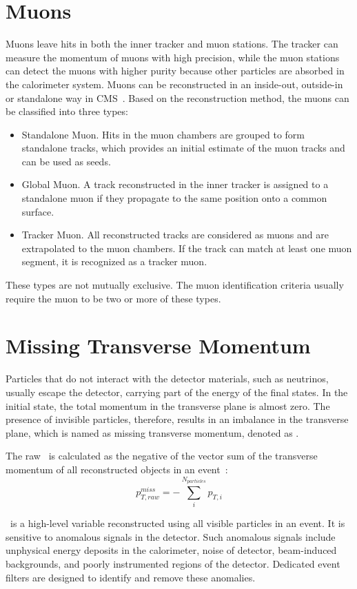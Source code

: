 \documentclass[thesis.tex]{subfiles}
\begin{document}
\section{Muons}
Muons leave hits in both the inner tracker and muon stations.
The tracker can measure the momentum of muons with high precision, while the muon stations can detect the muons with higher purity because other particles are absorbed in the calorimeter system. 
Muons can be reconstructed in an inside-out, outside-in or standalone way in CMS~\cite{MuonPF}.
Based on the reconstruction method, the muons can be classified into three types: 
\begin{itemize}
	\item Standalone Muon. Hits in the muon chambers are grouped to form standalone tracks, which provides an initial estimate of the muon tracks and can be used as seeds.
	\item Global Muon. A track reconstructed in the inner tracker is assigned to a standalone muon if they propagate to the same position onto a common surface. 
	\item Tracker Muon. All reconstructed tracks are considered as muons and are extrapolated to the muon chambers. If the track can match at least one muon segment, it is recognized as a tracker muon. 
\end{itemize}
These types are not mutually exclusive.
The muon identification criteria usually require the muon to be two or more of these types. 

\section{Missing Transverse Momentum}
Particles that do not interact with the detector materials, such as neutrinos, usually escape the detector, carrying part of the energy of the final states.
In the initial state, the total momentum in the transverse plane is almost zero. 
The presence of invisible particles, therefore, results in an imbalance in the transverse plane, which is named as missing transverse momentum, denoted as \MET.

The raw \MET~is calculated as the negative of the vector sum of the transverse momentum of all reconstructed objects in an event~\cite{METPF}:
\begin{equation*}
	p_{T, raw}^{miss} = - \sum_{i}^{N_{particles}}p_{T,i}
\end{equation*}

\MET~is a high-level variable reconstructed using all visible particles in an event.
It is sensitive to anomalous signals in the detector.
Such anomalous signals include unphysical energy deposits in the calorimeter, noise of detector, beam-induced backgrounds, and poorly instrumented regions of the detector.
Dedicated event filters are designed to identify and remove these anomalies. 
\end{document}
